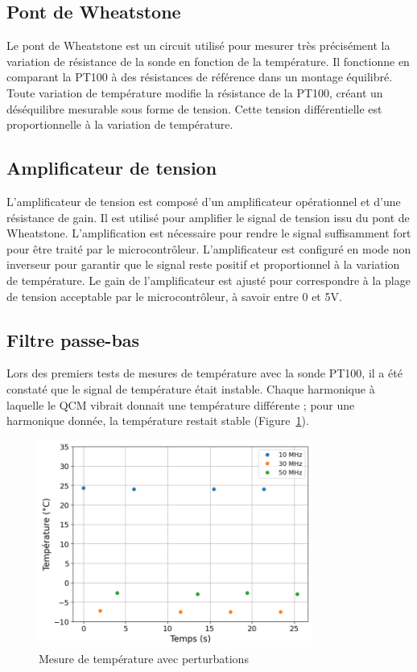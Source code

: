 
\subsection{Pont de Wheatstone}
Le pont de Wheatstone est un circuit utilisé pour mesurer très précisément la variation de résistance de la sonde en fonction de la température. 
Il fonctionne en comparant la PT100 à des résistances de référence dans un montage équilibré. Toute variation de température modifie la résistance de la PT100, 
créant un déséquilibre mesurable sous forme de tension. Cette tension différentielle est proportionnelle à la variation de température.

\subsection{Amplificateur de tension}
L'amplificateur de tension est composé d'un amplificateur opérationnel et d'une résistance de gain. 
Il est utilisé pour amplifier le signal de tension issu du pont de Wheatstone.
L'amplification est nécessaire pour rendre le signal suffisamment fort pour être traité par le microcontrôleur.
L'amplificateur est configuré en mode non inverseur pour garantir que le signal reste positif et proportionnel à la variation de température.
Le gain de l'amplificateur est ajusté pour correspondre à la plage de tension acceptable par le microcontrôleur, à savoir entre 0 et 5V.

\subsection{Filtre passe-bas}
Lors des premiers tests de mesures de température avec la sonde PT100, il a été constaté que le signal de température était instable.
Chaque harmonique à laquelle le QCM vibrait donnait une température différente ; pour une harmonique donnée, la température restait stable (Figure~\ref{fig:TempBruit}).
\begin{figure}[H]
    \centering
    \includegraphics[width=0.8\textwidth]{assets/figures/TempBruit.png}
    \caption{Mesure de température avec perturbations}
    \label{fig:TempBruit}
\end{figure}

